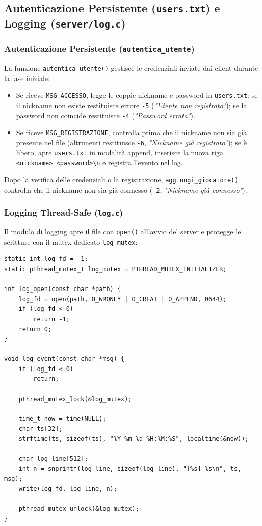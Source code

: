 \documentclass[11pt,a4paper]{article}
\begin{document}
\clearpage

\subsection{Autenticazione Persistente (\texttt{users.txt}) e Logging (\texttt{server/log.c})}

\subsubsection{Autenticazione Persistente (\texttt{autentica\_utente})}
La funzione \texttt{autentica\_utente()} gestisce le credenziali inviate dai client durante la fase iniziale:
\begin{itemize}
    \item Se riceve \texttt{MSG\_ACCESSO}, legge le coppie nickname e password in \texttt{users.txt}: se il nickname non esiste restituisce errore \texttt{-5} (\textit{"Utente non registrato"}); se la password non coincide restituisce \texttt{-4} (\textit{"Password errata"}).
    \item Se riceve \texttt{MSG\_REGISTRAZIONE}, controlla prima che il nickname non sia già presente nel file (altrimenti restituisce \texttt{-6}, \textit{"Nickname già registrato"}); se è libero, apre \texttt{users.txt} in modalità append, inserisce la nuova riga \texttt{<nickname> <password>\textbackslash n} e registra l'evento nel log.
\end{itemize}

Dopo la verifica delle credenziali o la registrazione, \texttt{aggiungi\_giocatore()} controlla che il nickname non sia già connesso (\texttt{-2}, \textit{"Nickname già connesso"}).

\subsubsection{Logging Thread-Safe (\texttt{log.c})}
Il modulo di logging apre il file con \texttt{open()} all'avvio del server e protegge le scritture con il mutex dedicato \texttt{log\_mutex}:

\begin{lstlisting}[style=cstyle]
static int log_fd = -1;
static pthread_mutex_t log_mutex = PTHREAD_MUTEX_INITIALIZER;

int log_open(const char *path) {
    log_fd = open(path, O_WRONLY | O_CREAT | O_APPEND, 0644);
    if (log_fd < 0)
        return -1;
    return 0;
}

void log_event(const char *msg) {
    if (log_fd < 0)
        return;

    pthread_mutex_lock(&log_mutex);

    time_t now = time(NULL);
    char ts[32];
    strftime(ts, sizeof(ts), "%Y-%m-%d %H:%M:%S", localtime(&now));

    char log_line[512];
    int n = snprintf(log_line, sizeof(log_line), "[%s] %s\n", ts, msg);
    write(log_fd, log_line, n);

    pthread_mutex_unlock(&log_mutex);
}
\end{lstlisting}
\end{document}

